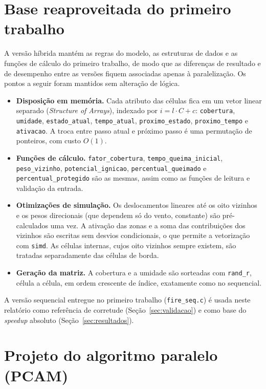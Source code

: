 \documentclass[11pt,a4paper]{article}
\begin{document}
\section{Base reaproveitada do primeiro trabalho}
\label{sec:base}

A versão híbrida mantém as regras do modelo, as estruturas de dados e as funções de cálculo do primeiro trabalho, de modo que as diferenças de resultado e de desempenho entre as versões fiquem associadas apenas à paralelização. Os pontos a seguir foram mantidos sem alteração de lógica.

\begin{itemize}
    \item \textbf{Disposição em memória.} Cada atributo das células fica em um vetor linear separado (\emph{Structure of Arrays}), indexado por $i = l \cdot C + c$: \texttt{cobertura}, \texttt{umidade}, \texttt{estado\_atual}, \texttt{tempo\_atual}, \texttt{proximo\_estado}, \texttt{proximo\_tempo} e \texttt{ativacao}. A troca entre passo atual e próximo passo é uma permutação de ponteiros, com custo $O(1)$.
    \item \textbf{Funções de cálculo.} \texttt{fator\_cobertura}, \texttt{tempo\_queima\_inicial}, \texttt{peso\_vizinho}, \texttt{potencial\_ignicao}, \texttt{percentual\_queimado} e \texttt{percentual\_protegido} são as mesmas, assim como as funções de leitura e validação da entrada.
    \item \textbf{Otimizações de simulação.} Os deslocamentos lineares até os oito vizinhos e os pesos direcionais (que dependem só do vento, constante) são pré-calculados uma vez. A ativação das zonas e a soma das contribuições dos vizinhos são escritas sem desvios condicionais, o que permite a vetorização com \texttt{simd}. As células internas, cujos oito vizinhos sempre existem, são tratadas separadamente das células de borda.
    \item \textbf{Geração da matriz.} A cobertura e a umidade são sorteadas com \texttt{rand\_r}, célula a célula, em ordem crescente de índice, exatamente como no sequencial.
\end{itemize}

A versão sequencial entregue no primeiro trabalho (\texttt{fire\_seq.c}) é usada neste relatório como referência de corretude (Seção~\ref{sec:validacao}) e como base do \emph{speedup} absoluto (Seção~\ref{sec:resultados}).

\section{Projeto do algoritmo paralelo (PCAM)}
\label{sec:pcam}
\end{document}
